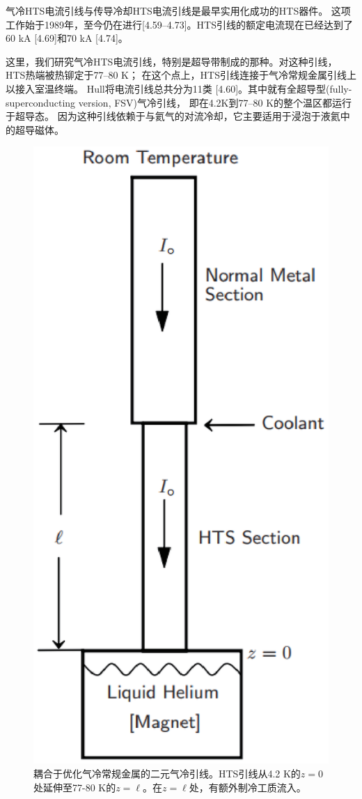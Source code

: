 气冷HTS电流引线与传导冷却HTS电流引线是最早实用化成功的HTS器件。
这项工作始于1989年，至今仍在进行[4.59–4.73]。HTS引线的额定电流现在已经达到了60 kA [4.69]和70 kA [4.74]。

这里，我们研究气冷HTS电流引线，特别是超导带制成的那种。对这种引线，HTS热端被热铆定于77–80 K；
在这个点上，HTS引线连接于气冷常规金属引线上以接入室温终端。
Hull将电流引线总共分为11类 [4.60]。其中就有全超导型(fully-superconducting version, FSV)气冷引线，
即在4.2K到77–80 K的整个温区都运行于超导态。
因为这种引线依赖于与氦气的对流冷却，它主要适用于浸泡于液氦中的超导磁体。

\begin{figure}[htbp]
	\centering
	\includegraphics[scale=0.5]{chpt4/figs/fig4.21.eps}
	\caption{耦合于优化气冷常规金属的二元气冷引线。HTS引线从4.2 K的$z=0$处延伸至77-80 K的$z=\ell$。在$z=\ell$处，有额外制冷工质流入。}
\end{figure}

